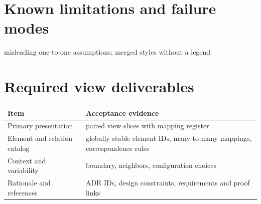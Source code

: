 \documentclass[10pt,letterpaper]{article}
\begin{document}
\section{Known limitations and failure modes}
misleading one-to-one assumptions; merged styles without a legend

\section{Required view deliverables}
\small
\begin{tabularx}{\linewidth}{@{}YY@{}}
\toprule
\textbf{Item} & \textbf{Acceptance evidence} \\
\midrule
Primary presentation & paired view slices with mapping register \\
Element and relation catalog & globally stable element IDs, many-to-many mappings, correspondence rules \\
Context and variability & boundary, neighbors, configuration choices \\
Rationale and references & ADR IDs, design constraints, requirements and proof links \\
\bottomrule
\end{tabularx}
\normalsize
\end{document}
